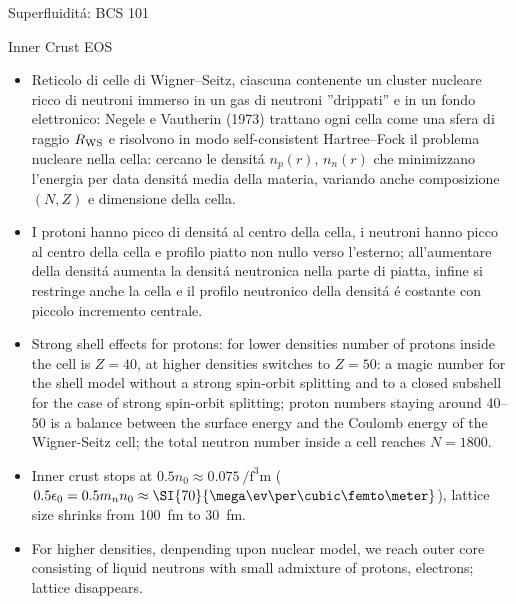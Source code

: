 \begin{frame}{Superfluidit\'a: BCS 101}
\end{frame}

\begin{frame}{Inner Crust EOS}
    \begin{itemize}
        \item Reticolo di celle di Wigner–Seitz, ciascuna contenente un cluster nucleare ricco di neutroni immerso in un gas di neutroni ''drippati'' e in un fondo elettronico: Negele e Vautherin (1973) trattano ogni cella come una sfera di raggio \(R_{\rm WS}\) e risolvono in modo self-consistent Hartree–Fock il problema nucleare nella cella: cercano le densit\'a $n_p(r)$, $n_n(r)$ che minimizzano l'energia per data densit\'a media della materia, variando anche composizione $(N,Z)$ e dimensione della cella.
        \item I protoni hanno picco di densit\'a al centro della cella, i neutroni hanno picco al centro della cella e profilo piatto non nullo verso l'esterno; all'aumentare della densit\'a aumenta la densit\'a neutronica nella parte di piatta, infine si restringe anche la cella e il profilo neutronico della densit\'a \'e costante con piccolo incremento centrale.
        \item Strong shell effects for protons: for lower densities number of protons inside the cell is $Z=40$, at higher densities switches to $Z=50$: a magic number for the shell model without a strong spin-orbit splitting and to a closed subshell for the case of strong spin-orbit splitting; proton numbers staying around \numrange{40}{50} is a balance between the surface energy and the Coulomb energy of the Wigner-Seitz cell; the total neutron number inside a cell reaches $N=1800$.
        \item Inner crust stops at $0.5n_0\approx\SI{0.075}{\per\cubic\femto\meter}$ ($0.5\epsilon_0=0.5m_nn_0\approx\SI{70}{\mega\ev\per\cubic\femto\meter}$), lattice size shrinks from \SI{100}{\femto\meter} to \SI{30}{\femto\meter}.
        \item For higher densities, denpending upon nuclear model, we reach outer core consisting of liquid neutrons with small admixture of protons, electrons; lattice disappears.
    \end{itemize}
\end{frame}

